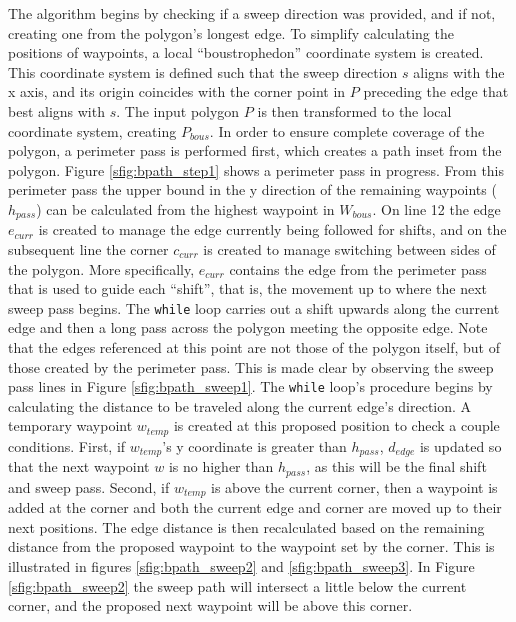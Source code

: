 The algorithm begins by checking if a sweep direction was provided, and if not, creating one from the polygon's longest edge.
To simplify calculating the positions of waypoints, a local ``boustrophedon'' coordinate system is created.
This coordinate system is defined such that the sweep direction $s$ aligns with the x axis, and its origin coincides with the corner point in $P$ preceding the edge that best aligns with $s$.
The input polygon $P$ is then transformed to the local coordinate system, creating $P_{bous}$.
In order to ensure complete coverage of the polygon, a perimeter pass is performed first, which creates a path inset from the polygon.
Figure \ref{sfig:bpath_step1} shows a perimeter pass in progress.
From this perimeter pass the upper bound in the y direction of the remaining waypoints ($h_{pass}$) can be calculated from the highest waypoint in $W_{bous}$.
On line 12 the edge $e_{curr}$ is created to manage the edge currently being followed for shifts, and on the subsequent line the corner $c_{curr}$ is created to manage switching between sides of the polygon.
More specifically, $e_{curr}$ contains the edge from the perimeter pass that is used to guide each ``shift'', that is, the movement up to where the next sweep pass begins.
The \verb|while| loop carries out a shift upwards along the current edge and then a long pass across the polygon meeting the opposite edge.
Note that the edges referenced at this point are not those of the polygon itself, but of those created by the perimeter pass.
This is made clear by observing the sweep pass lines in Figure \ref{sfig:bpath_sweep1}.
The \verb|while| loop's procedure begins by calculating the distance to be traveled along the current edge's direction.
A temporary waypoint $w_{temp}$ is created at this proposed position to check a couple conditions.
First, if $w_{temp}$'s y coordinate is greater than $h_{pass}$, $d_{edge}$ is updated so that the next waypoint $w$ is no higher than $h_{pass}$, as this will be the final shift and sweep pass.
Second, if $w_{temp}$ is above the current corner, then a waypoint is added at the corner and both the current edge and corner are moved up to their next positions.
The edge distance is then recalculated based on the remaining distance from the proposed waypoint to the waypoint set by the corner.
This is illustrated in figures \ref{sfig:bpath_sweep2} and \ref{sfig:bpath_sweep3}.
In Figure \ref{sfig:bpath_sweep2} the sweep path will intersect a little below the current corner, and the proposed next waypoint will be above this corner.
